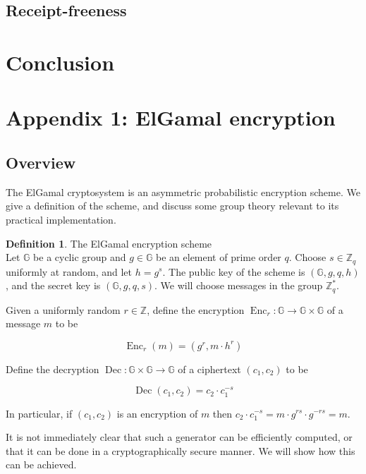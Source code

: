 \documentclass[11pt,twoside,a4paper]{article}
\DeclareMathOperator{\Enc}{Enc}
\DeclareMathOperator{\Dec}{Dec}
\theoremstyle{definition}
\newtheorem{definition}{Definition}[section]
\begin{document}
\subsection{Receipt-freeness}
\section{Conclusion}
\vfill\pagebreak
\section{Appendix 1: ElGamal encryption}\label{app-elgamal}
\subsection{Overview}
The ElGamal cryptosystem is an asymmetric probabilistic encryption scheme. We give a definition of the scheme, and discuss some group theory relevant to its practical implementation.
\begin{definition}{The ElGamal encryption scheme}\\
    Let \(\mathbb{G}\) be a cyclic group and \(g\in\mathbb{G}\) be an element of prime order \(q\). Choose \(s\in\mathbb{Z}_q\) uniformly at random, and let \(h=g^s\). The public key of the scheme is \((\mathbb{G}, g, q, h)\), and the secret key is \((\mathbb{G}, g, q, s)\). We will choose messages in the group \(\mathbb{Z}^*_q\).

    Given a uniformly random \(r\in\mathbb{Z}\), define the encryption \(\Enc_r:\mathbb{G}\rightarrow\mathbb{G}\times\mathbb{G}\) of a message \(m\) to be
    
    \[\Enc_r(m) = (g^r, m\cdot h^r)\]

    Define the decryption \(\Dec:\mathbb{G}\times\mathbb{G}\rightarrow \mathbb{G}\) of a ciphertext \((c_1, c_2)\) to be
    
    \[\Dec(c_1,c_2)=c_2\cdot c_1^{-s}\]

    In particular, if \((c_1,c_2)\) is an encryption of \(m\) then \(c_2\cdot c_1^{-s}=m\cdot g^{rs}\cdot g^{-rs}=m\).
\end{definition}
It is not immediately clear that such a generator can be efficiently computed, or that it can be done in a cryptographically secure manner. We will show how this can be achieved.
\end{document}
